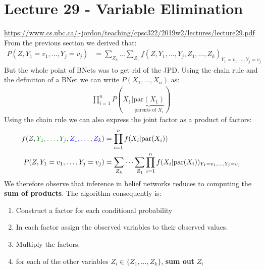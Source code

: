 \documentclass{article}
\def\blu#1{{\color{blu}#1}}
\def\gre#1{{\color{gre}#1}}
\begin{document}
\section*{Lecture 29 - Variable Elimination}
\url{https://www.cs.ubc.ca/~jordon/teaching/cpsc322/2019w2/lectures/lecture29.pdf}
From the previous section we derived that:
\begin{align*}
P(Z, Y_1 = v_1, \dots, Y_j = v_j) &= \sum_{Z_k} \dots \sum_{Z_1} f(Z, Y_1, \dots , Y_j, Z_1, \dots, Z_k)_{Y_1 = v_1, \dots, Y_j = v_j}
\end{align*}
But the whole point of BNets was to get rid of the JPD. Using the chain rule and the definition of a BNet we can write $ P(X_1, \dots, X_n) $ as:
\begin{align*}
\prod_{i=1}^n P(X_1|\underbrace{\text{par}(X_1)}_{\text{parents of }X_i})
\end{align*}
 Using the chain rule we can also express the joint factor as a product of factors:
 \begin{align*}
 f(Z, \gre{Y_1, \dots , Y_j}, \blu{Z_1, \dots, Z_k}) &= \prod_{i=1}^n f(X_i | \text{par}(X_i)) \\
 P(Z, Y_1 = v_1, \dots, Y_j = v_j) &= \sum_{Z_k} \dots \sum_{Z_1} \prod_{i=1}^n f(X_i | \text{par}(X_i)) _{Y_1 = v_1, \dots, Y_j = v_j}
 \end{align*}
We therefore observe that inference in belief networks reduces to computing the \textbf{sum of products}. The algorithm consequently is:
\begin{enumerate}
	\item Construct a factor for each conditional probability
	\item In each factor \blu{assign} the observed variables to their observed values. 
	\item Multiply the factors. 
	\item for each of the other variables $ Z_i \in \{Z_1, \dots, Z_k\} $, \textbf{\blu{sum out}} $ Z_i $
\end{enumerate}
\end{document}
